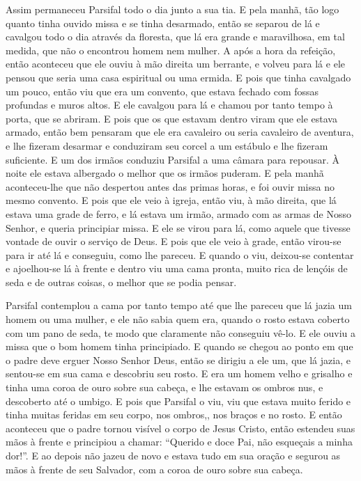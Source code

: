 Assim permaneceu Parsifal todo o dia junto a sua tia. E pela manhã, tão
logo quanto tinha ouvido missa e se tinha desarmado, então se separou de lá e
cavalgou todo o dia através da floresta, que lá era grande e maravilhosa, em
tal medida, que não o encontrou homem nem mulher. A após a hora da refeição,
então aconteceu que ele ouviu à mão direita um berrante, e volveu para lá e ele
pensou que seria uma casa espiritual ou uma ermida. E pois que tinha cavalgado
um pouco, então viu que era um convento, que estava fechado com fossas
profundas e muros altos. E ele cavalgou para lá e chamou por tanto tempo à
porta, que se abriram. E pois que os que estavam dentro viram que ele estava
armado, então bem pensaram que ele era cavaleiro ou seria cavaleiro de
aventura, e lhe fizeram desarmar e conduziram seu corcel a um estábulo e lhe
fizeram suficiente. E um dos irmãos conduziu Parsifal a uma câmara para
repousar. À noite ele estava albergado o melhor que os irmãos puderam. E pela
manhã aconteceu-lhe que não despertou antes das primas horas, e foi ouvir missa
no mesmo convento. E pois que ele veio à igreja, então viu, à mão
direita, que lá estava uma grade de ferro, e lá estava um irmão, armado com as
armas de Nosso Senhor, e queria principiar missa. E ele se virou para lá, como
aquele que tivesse vontade de ouvir o serviço de Deus. E pois que ele veio à
grade, então virou-se para ir até lá e conseguiu, como lhe pareceu. E quando o
viu, deixou-se contentar e ajoelhou-se lá à frente e dentro viu uma cama
pronta, muito rica de lençóis de seda e de outras coisas, o melhor que se podia
pensar.

Parsifal contemplou a cama por tanto tempo até que lhe pareceu que lá jazia
um homem ou uma mulher, e ele não sabia quem era, quando o rosto estava coberto
com um pano de seda, te modo que claramente não conseguiu vê-lo. E ele ouviu a
missa que o bom homem tinha principiado. E quando se chegou ao ponto em que o
padre deve erguer Nosso Senhor Deus, então se dirigiu a ele um, que lá jazia, e
sentou-se em sua cama e descobriu seu rosto. E era um homem velho e grisalho e
tinha uma coroa de ouro sobre sua cabeça, e lhe estavam os ombros nus, e
descoberto até o umbigo. E pois que Parsifal o viu, viu que estava muito
ferido e tinha muitas feridas em seu corpo, nos ombros,,  nos braços e no
rosto. E então aconteceu que o padre tornou visível o corpo de Jesus Cristo,
então estendeu suas mãos à frente e principiou a chamar: “Querido e doce Pai,
não esqueçais a minha dor!”. E ao depois não jazeu de novo e estava tudo em sua
oração e segurou as mãos à frente de seu Salvador, com a coroa de ouro sobre
sua cabeça.

